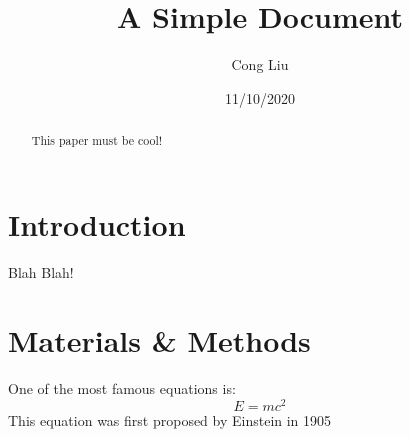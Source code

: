 \documentclass[12pt]{article}
\title{A Simple Document}
\author{Cong Liu}
\date{11/10/2020}
\begin{document}
  \maketitle
  
  \begin{abstract}
    This paper must be cool!
  \end{abstract}
  
  \section{Introduction}
    Blah Blah!
  
  \section{Materials \& Methods}
  One of the most famous equations is:
  \begin{equation}
    E = mc^2
  \end{equation}
  This equation was first proposed by Einstein in 1905 
  \cite{einstein1905does}
  
  
  
\end{document}
